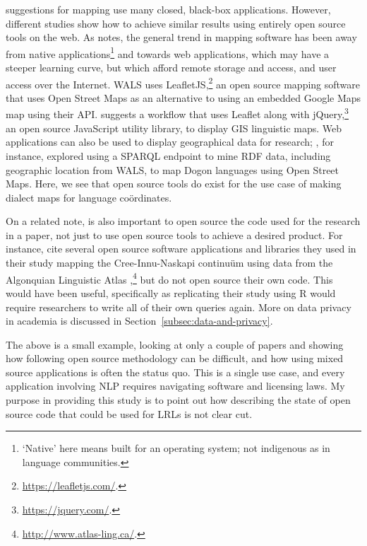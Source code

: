  suggestions for mapping use many closed, black-box applications. However, different studies show how to achieve similar results using entirely open source tools on the web. As \citet{hu2012multimedia, hu2018web} notes, the general trend in mapping software has been away from native applications\footnote{`Native' here means built for an operating system; not indigenous as in language communities.} and towards web applications, which may have a steeper learning curve, but which afford remote storage and access, and user access over the Internet. WALS uses LeafletJS,\footnote{\href{https://leafletjs.com/}{https://leafletjs.com/}. } an open source mapping software that uses Open Street Maps as an alternative to using an embedded Google Maps map using their API. \citet{hu2018web} suggests a workflow that uses Leaflet along with jQuery,\footnote{\href{https://jquery.com/}{https://jquery.com/}. } an open source JavaScript utility library, to display GIS linguistic maps. Web applications can also be used to display geographical data for research; \citet{littauer2013linguistic}, for instance, explored using a SPARQL endpoint to mine RDF data, including geographic location from WALS, to map Dogon languages using Open Street Maps. Here, we see that open source tools do exist for the use case of making dialect maps for language co\"ordinates. 

On a related note, is also important to open source the code used for the research in a paper, not just to use open source tools to achieve a desired product. For instance, \citet{cenerini2017mapping} cite several open source software applications and libraries they used in their study mapping the Cree-Innu-Naskapi continu\"{u}m using data from the Algonquian Linguistic Atlas \citep{junker2011linguistic},\footnote{\href{http://www.atlas-ling.ca/}{http://www.atlas-ling.ca/}. } but do not open source their own code. This would have been useful, specifically as replicating their study using R \citep{ihaka1996r} would require researchers to write all of their own queries again. More on data privacy in academia is discussed in Section~\ref{subsec:data-and-privacy}.

The above is a small example, looking at only a couple of papers and showing how following open source methodology can be difficult, and how using mixed source applications is often the status quo. This is a single use case, and every application involving NLP requires navigating software and licensing laws. My purpose in providing this study is to point out how describing the state of open source code that could be used for LRLs is not clear cut. 


